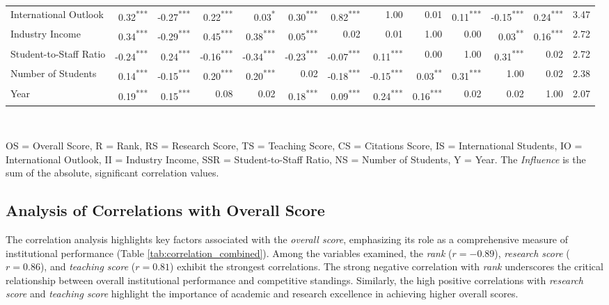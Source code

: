 \documentclass[conference]{IEEEtran}
\begin{document}
\begin{table*}[h!]
\begin{tabular}{|l|r|r|r|r|r|r|r|r|r|r|r|r|}
		International Outlook & 0.32\textsuperscript{***} & -0.27\textsuperscript{***} & 0.22\textsuperscript{***} & 0.03\textsuperscript{*} & 0.30\textsuperscript{***} & 0.82\textsuperscript{***} & 1.00 & 0.01 & 0.11\textsuperscript{***} & -0.15\textsuperscript{***} & 0.24\textsuperscript{***} & 3.47 \\
		Industry Income & 0.34\textsuperscript{***} & -0.29\textsuperscript{***} & 0.45\textsuperscript{***} & 0.38\textsuperscript{***} & 0.05\textsuperscript{***} & 0.02 & 0.01 & 1.00 & 0.00 & 0.03\textsuperscript{**} & 0.16\textsuperscript{***} & 2.72 \\
		Student-to-Staff Ratio & -0.24\textsuperscript{***} & 0.24\textsuperscript{***} & -0.16\textsuperscript{***} & -0.34\textsuperscript{***} & -0.23\textsuperscript{***} & -0.07\textsuperscript{***} & 0.11\textsuperscript{***} & 0.00 & 1.00 & 0.31\textsuperscript{***} & 0.02 & 2.72 \\
		Number of Students & 0.14\textsuperscript{***} & -0.15\textsuperscript{***} & 0.20\textsuperscript{***} & 0.20\textsuperscript{***} & 0.02 & -0.18\textsuperscript{***} & -0.15\textsuperscript{***} & 0.03\textsuperscript{**} & 0.31\textsuperscript{***} & 1.00 & 0.02 & 2.38 \\
		Year & 0.19\textsuperscript{***} & 0.15\textsuperscript{***} & 0.08 & 0.02 & 0.18\textsuperscript{***} & 0.09\textsuperscript{***} & 0.24\textsuperscript{***} & 0.16\textsuperscript{***} & 0.02 & 0.02 & 1.00 & 2.07 \\
		\hline
	\end{tabular}
	\\
	\vspace{1mm} \scriptsize \raggedright OS = Overall Score, R = Rank, RS = Research Score, TS = Teaching Score, CS = Citations Score, IS = International Students, IO = International Outlook, II = Industry Income, SSR = Student-to-Staff Ratio, NS = Number of Students, Y = Year. The \textit{Influence} is the sum of the absolute, significant correlation values.
\end{table*}




\subsection{Analysis of Correlations with Overall Score}

The correlation analysis highlights key factors associated with the \textit{overall score}, emphasizing its role as a comprehensive measure of institutional performance (Table \ref{tab:correlation_combined}). Among the variables examined, the \textit{rank} ($r = -0.89$), \textit{research score} ($r = 0.86$), and \textit{teaching score} ($r = 0.81$) exhibit the strongest correlations. The strong negative correlation with \textit{rank} underscores the critical relationship between overall institutional performance and competitive standings. Similarly, the high positive correlations with \textit{research score} and \textit{teaching score} highlight the importance of academic and research excellence in achieving higher overall scores.
\end{document}
